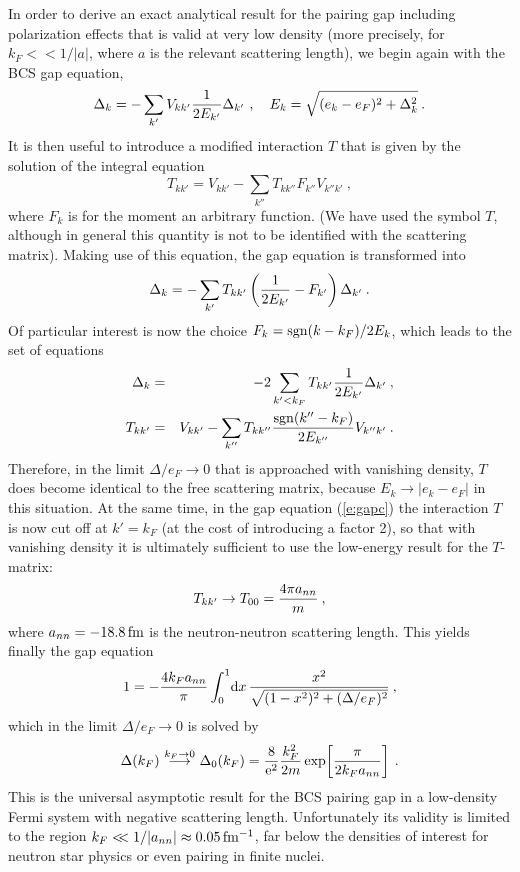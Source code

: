 \documentclass[runningheads]{svmult}
\newcommand{\be}{\begin{equation}}
\newcommand{\ee}{\end{equation}}
\newcommand{\bea}{\begin{eqnarray}}
\newcommand{\eea}{\end{eqnarray}}
\def\ra{\rightarrow}
\def\de{\Delta}
\def\ann{a_{nn}}
\begin{document}
In order to derive an exact analytical result for the pairing gap 
including polarization effects
that is valid at very low density
(more precisely, for $k_F<\!\!<1/|a|$, where $a$ is the relevant 
scattering length),
we begin again with the BCS gap equation,
\be
  \de_{k} = - \sum_{k'} V_{kk'} {1\over 2E_{k'}} \de_{k'} 
  \ ,\quad
  E_k = \sqrt{ (e_k-e_F)^2 + \de_k^2 }  \:.
\ee
It is then useful \cite{BCLL90,EEHE96,ANDER} to introduce a modified 
interaction $T$ that is given by the solution of the integral equation
\be
 T_{kk'} = V_{kk'}  - \sum_{k''}  T_{kk''} F_{k''} V_{k''k'} \:,
\ee
where $F_k$ is for the moment an arbitrary function.
(We have used the symbol $T$, although in general this quantity is
not to be identified with the scattering matrix).
Making use of this equation, the gap equation is transformed into
\be
  \de_{k} = - \sum_{k'} T_{kk'} 
  \left( {1\over 2E_{k'}} - F_{k'} \right) \de_{k'} \:.
\ee
Of particular interest is now the choice 
$F_k={\rm sgn}(k-k_F)/2E_k$, which leads to the set of equations
\bea
  \de_{k} &=& - 2 \sum_{k'<k_F} T_{kk'} {1\over 2E_{k'}} \de_{k'} \:,
\label{e:gapc}
\\
  T_{kk'} &=& V_{kk'}  
  - \sum_{k''} T_{kk''} {{\rm sgn}(k''-k_F)\over 2E_{k''}} V_{k''k'} \:.
\eea
Therefore, in the limit $\Delta/e_F\ra0$ that is approached with vanishing
density, $T$ does become identical to the free scattering matrix,
because $E_k \ra |e_k-e_F|$ in this situation.
At the same time, in the gap equation (\ref{e:gapc}) the interaction $T$ is 
now cut off at $k'=k_F$ 
(at the cost of introducing a factor 2), 
so that with vanishing density it is ultimately sufficient to use the 
low-energy result \cite{FW} for the $T$-matrix:
\be
  T_{kk'} \ra T_{00} = {4\pi \ann \over m} \:,   
\label{e:tlow}
\ee
where $\ann = -18.8{\,\rm fm}$ is the neutron-neutron scattering length.
This yields finally the gap equation
\be
  1 = -{4 k_F \ann \over \pi} 
  \int_0^1\! \D x\, {x^2 \over \sqrt{(1-x^2)^2 + (\de/e_F)^2} } \:,
\ee
which in the limit $\de/e_F \ra 0$ is solved by 
\cite{KHODEL96,GMB,BERTSCH,PET}
\begin{eqnarray}
 \Delta(k_F)
 \ {\buildrel k_F\ra 0  \over \longrightarrow}\ 
 \Delta_0(k_F) = 
 {8 \over \E^2} {k_F^2\over 2m} \exp\!\left[{\pi\over 2k_F \ann}\right] \:.
\label{e:appbcs}
\end{eqnarray}
This is the universal asymptotic result 
for the BCS pairing gap in a low-density Fermi system with negative 
scattering length.
Unfortunately its validity is limited to the region
$k_F<\!\!<1/|\ann| \approx 0.05\,\rm fm^{-1}$,
far below the densities of interest for neutron star physics
or even pairing in finite nuclei.
\end{document}
